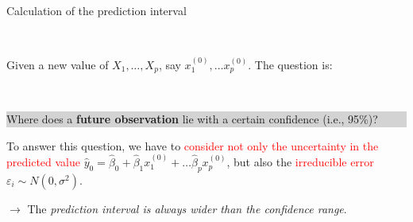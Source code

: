 \documentclass[10pt,ignorenonframetext,]{beamer}
\begin{document}
\begin{frame}

\begin{block}{Calculation of the prediction interval}

\(~\)

Given a new value of \(X_1, \ldots, X_p\), say
\(x_1^{(0)}, \ldots x_p^{(0)}\). The question is:

\(~\)

\colorbox{lightgray}{\begin{minipage}{10cm}
Where does a {\bf future observation} lie with a certain confidence (i.e., 95\%)?
\end{minipage}}

\vspace{4mm}

To answer this question, we have to
\textcolor{red}{consider not only the uncertainty in the predicted value}
\(\hat y_0 = \hat\beta_0 + \hat\beta_1 x_1^{(0)} + \ldots \hat\beta_p x_p^{(0)}\),
but also the \textcolor{red}{irreducible error}
\(\varepsilon_i \sim N(0,\sigma^2)\).

\vspace{4mm}

\(\rightarrow\) The \emph{prediction interval is always wider than the
confidence range}.

\end{block}

\end{frame}
\end{document}
